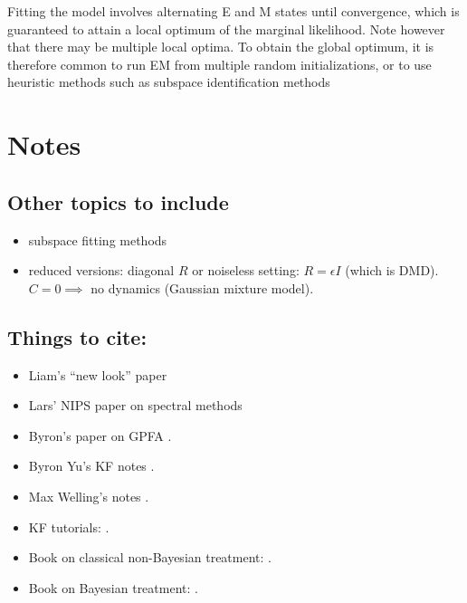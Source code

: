 \documentclass[10pt]{article}
\begin{document}
Fitting the model involves alternating E and M states until
convergence, which is guaranteed to attain a local optimum of the
marginal likelihood. Note however that there may be multiple local
optima.  To obtain the global optimum, it is therefore common to run EM from
multiple random initializations, or to use heuristic methods such as
subspace identification methods 



\section{Notes}

\subsection{Other topics to include}

\begin{itemize}
\item subspace fitting methods 
\item reduced versions: diagonal $R$ or noiseless setting: $R=\epsilon
  I$ (which is DMD).  $C=0 \implies$ no dynamics (Gaussian
  mixture model).
\end{itemize}

\subsection{Things to cite:}
\begin{itemize}
\item Liam's ``new look'' paper \cite{Paninski10}
\item Lars' NIPS paper on spectral methods \cite{Buesing2012neurips}
\item Byron's paper on GPFA \cite{BYu09}.
\item Byron Yu's KF notes \cite{BYutechreport04}.
\item Max Welling's notes \cite{Welling10}. 
\item KF tutorials: \cite{Faragher12,Barker95}.
\item Book on classical non-Bayesian treatment: \cite{Sayed11book}.
\item Book on Bayesian treatment: \cite{SarkkaBook2013}.
\end{itemize}
\end{document}
